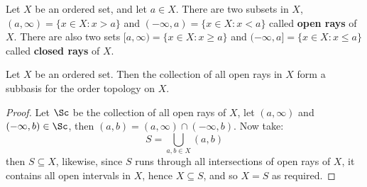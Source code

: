\begin{definition}
    Let $X$ be an ordered set, and let  $a \in X$. There are two subsets in  $X$,
    $(a,\infty)=\{x \in X: x>a\}$ and $(-\infty,a)=\{x \in X: x<a\}$ called \textbf{open rays} of $X$.
    There are also two sets $[a,\infty)=\{x \in X: x \geq a\}$ and $(-\infty,a]=\{x \in X: x \leq a\}$
    called \textbf{closed rays} of $X$.
\end{definition}

\begin{theorem}\label{1.3.2}
    Let $X$ be an ordered set. Then the collection of all open rays in  $X$ form a subbasis
    for the order topology on  $X$.
\end{theorem}
\begin{proof}
    Let $\Sc$ be the collection of all open rays of  $X$, let  $(a,\infty)$ and  $(-\infty,b) \in \Sc$,
    then  $(a,b)=(a,\infty) \cap (-\infty,b)$. Now take:
        \begin{equation*}
            S=\bigcup_{a,b \in X}{(a,b)}
        \end{equation*}
    then $S \subseteq X$, likewise, since  $S$ runs through all intersections of open rays
    of $X$, it contains all open intervals in  $X$, hence  $X \subseteq S$, and so  $X=S$
    as required.
\end{proof}
